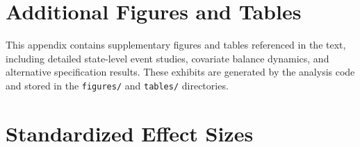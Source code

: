 \documentclass[12pt]{article}
\begin{document}
\section{Additional Figures and Tables}
\label{app:additional}

This appendix contains supplementary figures and tables referenced in the text, including detailed state-level event studies, covariate balance dynamics, and alternative specification results. These exhibits are generated by the analysis code and stored in the \texttt{figures/} and \texttt{tables/} directories.


\section{Standardized Effect Sizes}
\label{sec:sde}


\end{document}
